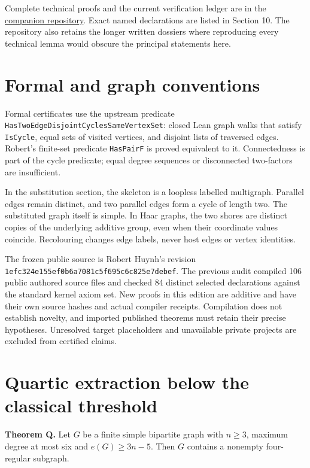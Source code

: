 \documentclass[smallextended]{svjour3}
\newcounter{none} %
\begin{document}
Complete technical proofs and the current verification ledger are in the
\href{https://github.com/alejandrozu/openmath-2026-judging/tree/70c5ec3107658182f22c207d4c50f53f9cb3e602/robert-review-2026-10-07}{companion
repository}. Exact named declarations are listed in Section 10. The
repository also retains the longer written dossiers where reproducing
every technical lemma would obscure the principal statements here.

\section{Formal and graph
conventions}\label{formal-and-graph-conventions}

Formal certificates use the upstream predicate
{\ttfamily\nolinkurl{HasTwoEdgeDisjointCyclesSameVertexSet}}: closed Lean graph walks
that satisfy \texttt{IsCycle}, equal sets of visited vertices, and
disjoint lists of traversed edges. Robert's finite-set predicate
\texttt{HasPairF} is proved equivalent to it. Connectedness is part of
the cycle predicate; equal degree sequences or disconnected two-factors
are insufficient.

In the substitution section, the skeleton is a loopless labelled
multigraph. Parallel edges remain distinct, and two parallel edges form
a cycle of length two. The substituted graph itself is simple. In Haar
graphs, the two shores are distinct copies of the underlying additive
group, even when their coordinate values coincide. Recolouring changes
edge labels, never host edges or vertex identities.

The frozen public source is Robert Huynh's revision
{\ttfamily\nolinkurl{1efc324e155ef0b6a7081c5f695c6c825e7debef}}. The previous audit
compiled 106 public authored source files and checked 84 distinct
selected declarations against the standard kernel axiom set. New proofs
in this edition are additive and have their own source hashes and actual
compiler receipts. Compilation does not establish novelty, and imported
published theorems must retain their precise hypotheses. Unresolved
target placeholders and unavailable private projects are excluded from
certified claims.

\section{Quartic extraction below the classical
threshold}\label{quartic-extraction-below-the-classical-threshold}

\textbf{Theorem Q.} Let \(G\) be a finite simple bipartite graph with
\(n\geq3\), maximum degree at most six and \(e(G)\geq3n-5\). Then \(G\)
contains a nonempty four-regular subgraph.
\end{document}
